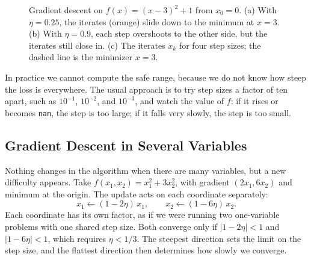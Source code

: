\begin{figure}[ht]
  \caption{Gradient descent on $f(x) = (x - 3)^2 + 1$ from $x_0 = 0$.
    (a) With $\eta = 0.25$, the iterates (orange) slide down to the minimum
    at $x = 3$. (b) With $\eta = 0.9$, each step overshoots to the other
    side, but the iterates still close in. (c) The iterates $x_k$ for four
    step sizes; the dashed line is the minimizer $x = 3$.}
  \label{fig:ch02-step-sizes}
\end{figure}

In practice we cannot compute the safe range, because we do not know how
steep the loss is everywhere. The usual approach is to try step sizes a
factor of ten apart, such as $10^{-1}$, $10^{-2}$, and $10^{-3}$, and
watch the value of $f$: if it rises or becomes \texttt{nan}, the step is too
large; if it falls very slowly, the step is too small.

\subsection{Gradient Descent in Several Variables}
\label{sec:ch02-gd-multi}

Nothing changes in the algorithm when there are many variables, but a new
difficulty appears. Take $f(x_1, x_2) = x_1^2 + 3x_2^2$, with gradient
$(2x_1, 6x_2)$ and minimum at the origin. The update acts on each
coordinate separately:
\[
  x_1 \leftarrow (1 - 2\eta)\, x_1, \qquad
  x_2 \leftarrow (1 - 6\eta)\, x_2 .
\]
Each coordinate has its own factor, as if we were running two
one-variable problems with one shared step size. Both converge only if
$|1 - 2\eta| < 1$ and $|1 - 6\eta| < 1$, which requires $\eta < 1/3$. The
steepest direction sets the limit on the step size, and the flattest
direction then determines how slowly we converge.

